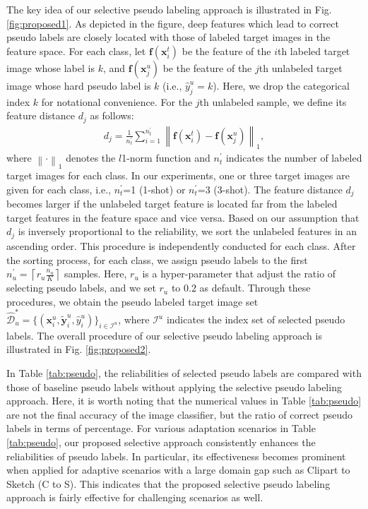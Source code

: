 \documentclass[a4paper,conference]{IEEEtran}
\begin{document}
The key idea of our selective pseudo labeling approach is illustrated in Fig. \ref{fig:proposed1}. As depicted in the figure, deep features which lead to correct pseudo labels are closely located with those of labeled target images in the feature space. For each class, let $\mathbf{f}(\mathbf{x}_{i}^{t})$ be the feature of the $i$th labeled target image whose label is $k$, and $\mathbf{f}(\mathbf{x}_{j}^{u})$ be the feature of the $j$th unlabeled target image whose hard pseudo label is $k$ (i.e., $\hat{y}_{j}^{u}=k$). Here, we drop the categorical index $k$ for notational convenience. For the $j$th unlabeled sample, we define its feature distance $d_{j}$ as follows:
\begin{eqnarray}
d_{j}=\frac{1}{n_{t}^{\prime}}\sum_{i=1}^{n_{t}^{\prime}} \left \| \mathbf{f}(\mathbf{x}_{i}^{t})-\mathbf{f}(\mathbf{x}_{j}^{u})\right \|_{1},
\label{eqn:d}
\end{eqnarray}
where $\left \| \cdot \right \|_{1}$ denotes the $\textit{l}$1-norm function and $n_{t}^{\prime}$ indicates the number of labeled target images for each class. In our experiments, one or three target images are given for each class, i.e., $n_{t}^{\prime}$=1 (1-shot) or $n_{t}^{\prime}$=3 (3-shot). The feature distance $d_{j}$ becomes larger if the unlabeled target feature is located far from the labeled target features in the feature space and vice versa. Based on our assumption that $d_{j}$ is inversely proportional to the reliability, we sort the unlabeled features in an ascending order. This procedure is independently conducted for each class. After the sorting process, for each class, we assign pseudo labels to the first $n_{u}^{\prime}=\left \lceil r_{u}\frac{n_{u}}{K} \right \rceil$ samples. Here, $r_{u}$ is a hyper-parameter that adjust the ratio of selecting pseudo labels, and we set $r_{u}$ to $0.2$ as default. Through these procedures, we obtain the pseudo labeled target image set $\hat{\mathcal{D}}_{u}^{*}=\{(\mathbf{x}_{i}^{u}, \widetilde{\mathbf{y}}_{i}^{u}, \hat{y}_{i}^{u})\}_{i\in \mathcal{I}^{u}}$, where $\mathcal{I}^{u}$ indicates the index set of selected pseudo labels. The overall procedure of our selective pseudo labeling approach is illustrated in Fig. \ref{fig:proposed2}.


In Table \ref{tab:pseudo}, the reliabilities of selected pseudo labels are compared with those of baseline pseudo labels without applying the selective pseudo labeling approach. Here, it is worth noting that the numerical values in Table \ref{tab:pseudo} are not the final accuracy of the image classifier, but the ratio of correct pseudo labels in terms of percentage. For various adaptation scenarios in Table \ref{tab:pseudo}, our proposed selective approach consistently enhances the reliabilities of pseudo labels. In particular, its effectiveness becomes prominent when applied for adaptive scenarios with a large domain gap such as Clipart to Sketch (C to S). This indicates that the proposed selective pseudo labeling approach is fairly effective for challenging scenarios as well.
\end{document}
